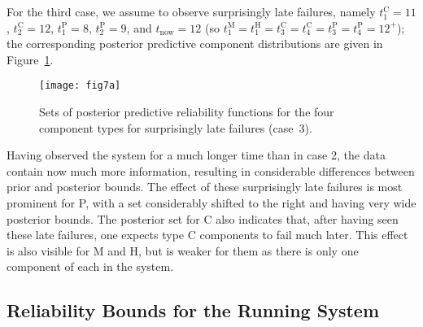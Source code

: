 \documentclass[Journal,letterpaper]{ascelike-new}
\def\tnow{t_\text{now}}
\begin{document}
For the third case, we assume to observe surprisingly late failures,
namely $t_1^\text{C} = 11$, $t_2^\text{C} = 12$, $t_1^\text{P} = 8$, $t_2^\text{P} = 9$,
and $\tnow = 12$ (so $t_1^\text{M} = t_1^\text{H} = t_3^\text{C} = t_4^\text{C} = t_3^\text{P} = t_4^\text{P} = 12^+$);
the corresponding posterior predictive component distributions are given in Figure~\ref{fig:comppost-3}.
%
\begin{figure}
\texttt{[image: fig7a]}
\caption{Sets of posterior predictive reliability functions for the four component types
for surprisingly late failures (case~3).}
\label{fig:comppost-3}
\end{figure}
%
Having observed the system for a much longer time than in case 2,
the data contain now much more information,
resulting in considerable differences between prior and posterior bounds. %
The effect of these surprisingly late failures is most prominent for P,
with a set considerably shifted to the right and having very wide posterior bounds.
The posterior set for C also indicates that,
after having seen these late failures, one expects type C components to fail much later.
This effect is also visible for M and H,
but is weaker for them as there is only one component of each in the system.

\subsection{Reliability Bounds for the Running System}
\label{sec:ex-sysrel}
\end{document}
